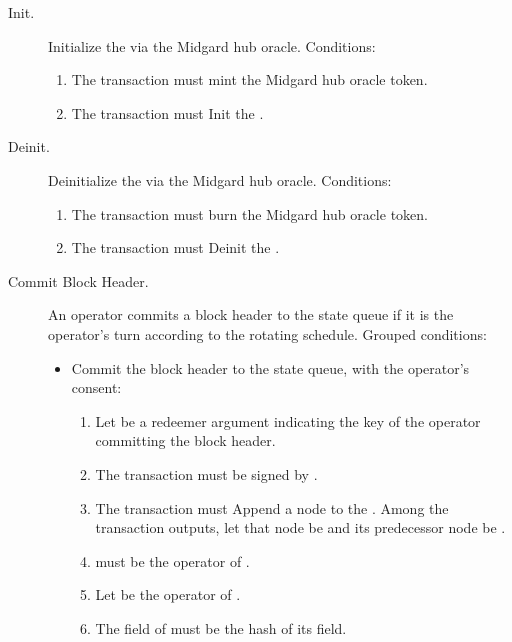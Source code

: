 \documentclass[../midgard.tex]{subfiles}
\begin{document}
\begin{description}
    \item[Init.] Initialize the  via the Midgard hub oracle.
      Conditions:
        \begin{enumerate}
            \item The transaction must mint the Midgard hub oracle token.
            \item The transaction must Init the .
        \end{enumerate}

    \item[Deinit.] Deinitialize the  via the Midgard hub oracle.
      Conditions:
        \begin{enumerate}
            \item The transaction must burn the Midgard hub oracle token.
            \item The transaction must Deinit the .
        \end{enumerate}

    \item[Commit Block Header.] An operator commits a block header to the state queue if it is the operator's turn according to the rotating schedule.
      Grouped conditions:
        \begin{itemize}
            \item Commit the block header to the state queue, with the operator's consent:
            \begin{enumerate}
                \item Let  be a redeemer argument indicating the key of the operator committing the block header.
                \item The transaction must be signed by .
                \item The transaction must Append a node to the .
                  Among the transaction outputs, let that node be  and its predecessor node be .
                \item {} must be the operator of .
                \item Let  be the operator of .
                \item The  field of  must be the hash of its  field.
            \end{enumerate}


\end{itemize}
\end{description}
\end{document}

